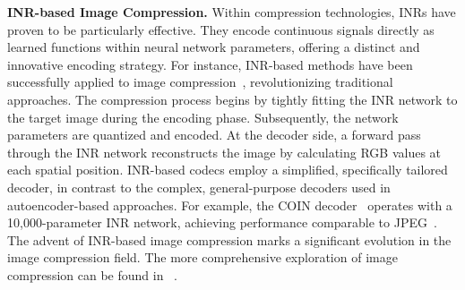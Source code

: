 \noindent \textbf{INR-based Image Compression.}
Within compression technologies, INRs have proven to be particularly effective. 
They encode continuous signals directly as learned functions within neural network parameters, offering a distinct and innovative encoding strategy. For instance, INR-based methods have been successfully applied to image compression~\cite{DBLP:journals/corr/abs-2112-04267,dupont2021coin,DBLP:journals/corr/abs-2201-12904,DBLP:journals/spl/ZhangZT23,DBLP:conf/iccv/LadunePHCL23}, revolutionizing traditional approaches. The compression process begins by tightly fitting the INR network to the target image during the encoding phase. Subsequently, the network parameters are quantized and encoded. At the decoder side, a forward pass through the INR network reconstructs the image by calculating RGB values at each spatial position. INR-based codecs employ a simplified, specifically tailored decoder, in contrast to the complex, general-purpose decoders used in autoencoder-based approaches. For example, the COIN decoder~\cite{dupont2021coin} operates with a 10,000-parameter INR network, achieving performance comparable to JPEG~\cite{DBLP:journals/cacm/Wallace91}. The advent of INR-based image compression marks a significant evolution in the image compression field. 
The more comprehensive exploration of image compression can be found in ~\cite{DBLP:journals/corr/TodericiOHVMBCS15,DBLP:conf/iclr/BalleLS17,DBLP:conf/nips/AgustssonMTCTBG17,DBLP:conf/iclr/BalleMSHJ18,DBLP:conf/iclr/TheisSCH17,DBLP:conf/icml/RippelB17,DBLP:conf/iccv/AgustssonTMTG19,DBLP:conf/cvpr/MentzerATTG18,DBLP:conf/nips/MinnenBT18,DBLP:conf/iclr/LeeCB19,DBLP:conf/icml/BlauM19,DBLP:conf/cvpr/ChengSTK20,DBLP:conf/cvpr/ChengFHGWZZS21,DBLP:journals/tip/ChenLMSCW21,DBLP:journals/tip/WangDTXL21,DBLP:journals/pami/MaLYLW22,DBLP:conf/cvpr/HeZSWQ21,DBLP:conf/mm/XieCC21,Jia_2024_CVPR,Zhang_2024_CVPR,DBLP:conf/iccv/YangM23,DBLP:conf/iccv/Park0K23,DBLP:conf/cvpr/LeeJCP022,DBLP:journals/pami/DuanLMHMZ24,DBLP:journals/pami/HuYML22,DBLP:journals/pami/0005ZGY021}.

